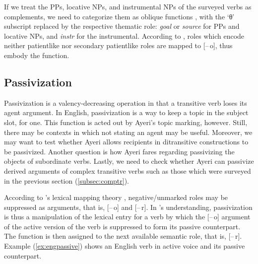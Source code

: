 If we treat the PPs, locative NPs, and instrumental NPs of the surveyed verbs
as complements, we need to categorize them as oblique functions \Oblique{},
with the `θ' subscript replaced by the respective thematic role: \textit{goal}
or \textit{source} for PPs and locative NPs, and \mbox{\textit{instr}} for the
instrumental. According to \textcites[331]{bresnan2016}[414]
{needhamtoivonen2011}, roles which encode neither patientlike nor secondary
patientlike roles are mapped to [–\,o], thus embody the \Oblique{} function.


\subsection{Passivization}
\label{subsubsec:valdecr}

Passivization is a valency-decreasing operation in that a transitive verb loses
its agent argument. In English, passivization is a way to keep a topic in the
subject slot, for one. This function is acted out by Ayeri's topic marking,
however. Still, there may be contexts in which not stating an agent may be
useful. Moreover, we may want to test whether Ayeri allows recipients in
ditransitive constructions to be passivized. Another question is how Ayeri
fares regarding passivizing the objects of subordinate verbs. Lastly, we need
to check whether Ayeri can passivize derived arguments of complex transitive
verbs such as those which were surveyed in the previous section
(\autoref{subsec:comptr}).

According to \Lfg{}'s lexical mapping theory
\parencites[324--348]{bresnan2016}[413--414]{needhamtoivonen2011},
negative/unmarked roles may be suppressed as arguments, that is, [–\,o] and
[–\,r]. In \Lfg{}'s understanding, passivization is thus a manipulation of the
lexical entry for a verb by which the [–\,o] argument of the active version of
the verb is suppressed to form its passive counterpart. The \Subj{} function is
then assigned to the next available semantic role, that is, [–\,r]. Example
(\ref{ex:engpassive}) shows an English verb in active voice and its passive
counterpart.

